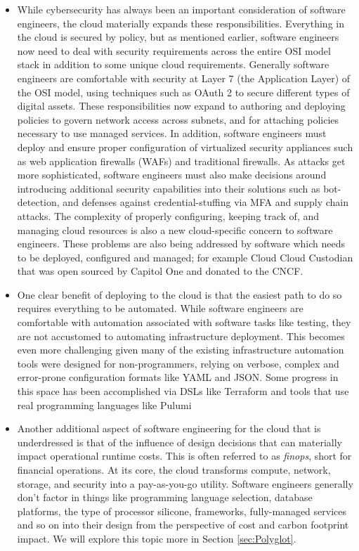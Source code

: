 \documentclass[conference]{IEEEconf}
\begin{document}
\begin{itemize}
	\item \vspace{-0.2cm} While cybersecurity has always been an important consideration of software engineers, the cloud materially expands these responsibilities. Everything in the cloud is secured by policy, but as mentioned earlier, software engineers now need to deal with security requirements across the entire OSI model\cite{OSIModel} stack in addition to some unique cloud requirements. Generally software engineers are comfortable with security at Layer 7 (the Application Layer) of the OSI model, using techniques such as OAuth 2\cite{oAuthStandard} to secure different types of digital assets. These responsibilities now expand to authoring and deploying policies to govern network access across subnets, and for attaching policies necessary to use managed services.  In addition, software engineers must deploy and ensure proper configuration of virtualized security appliances such as web application firewalls (WAFs) and traditional  firewalls. As attacks get more sophisticated, software engineers must also make decisions around introducing additional security capabilities into their solutions such as bot-detection, and defenses against credential-stuffing via MFA and supply chain attacks.  The complexity of properly configuring, keeping track of, and managing cloud resources is also a new cloud-specific concern to software engineers.  These problems are also being addressed by software which needs to be deployed, configured and managed; for example Cloud Cloud Custodian\cite{CloudCustodian} that was open sourced by Capitol One and donated to the CNCF. 
	
	\item \vspace{-0.2cm} One clear benefit of deploying to the cloud is that the easiest path to do so requires everything to be automated. While software engineers are comfortable with automation associated with software tasks like testing, they are not accustomed to automating infrastructure deployment. This becomes even more challenging given many of the existing infrastructure automation tools were designed for non-programmers, relying on verbose, complex and error-prone configuration formats like YAML and JSON. Some progress in this space has been accomplished via DSLs like Terraform\cite{terraform} and tools that use real programming languages like Pulumi\cite{Pulumi} 
	
	\item  \vspace{-0.2cm} Another additional aspect of software engineering for the cloud that is underdressed is that of the influence of design decisions that can materially impact operational runtime costs. This is often referred to as \textit{finops}, short for financial operations. At its core, the cloud transforms compute, network, storage, and security into a pay-as-you-go utility.  Software engineers generally don't factor in things like programming language selection, database platforms, the type of processor silicone, frameworks, fully-managed services and so on into their design from the perspective of cost and carbon footprint impact.  We will explore this topic more in Section \ref{sec:Polyglot}.
	

\end{itemize}
\end{document}
